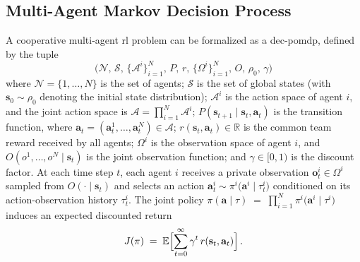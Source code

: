 \subsection{Multi-Agent Markov Decision Process}
A cooperative multi-agent \gls{rl} problem can be formalized as a \gls{dec-pomdp}\cite{oliehoek_concise_2016}, defined by the tuple
\begin{equation}
  \bigl(\mathcal{N},\,\mathcal{S},\,\{\mathcal{A}^i\}_{i=1}^N,\,P,\,r,\,\{\Omega^i\}_{i=1}^N,\,O,\,\rho_0,\,\gamma\bigr)
\end{equation}
where $\mathcal{N}=\{1,\dots,N\}$ is the set of agents; $\mathcal{S}$ is the set of global states (with $\mathbf{s}_0\sim\rho_0$ denoting the initial state distribution); $\mathcal{A}^i$ is the action space of agent $i$, and the joint action space is $\mathcal{A} = \prod_{i=1}^N \mathcal{A}^i$; $P(\mathbf{s}_{t+1} \mid \mathbf{s}_t, \mathbf{a}_t)$ is the transition function, where $\mathbf{a}_t=(\mathbf{a}^1_t,\dots,\mathbf{a}^N_t)\in\mathcal{A}$; $r(\mathbf{s}_t,\mathbf{a}_t)\in\mathbb{R}$ is the common team reward received by all agents; $\Omega^i$ is the observation space of agent $i$, and $O(o^1,\dots,o^N\mid \mathbf{s}_t)$ is the joint observation function; and $\gamma\in[0,1)$ is the discount factor.
At each time step $t$, each agent $i$ receives a private observation $\mathbf{o}^i_t \in \Omega^i$ sampled from $O(\cdot\mid \mathbf{s}_t)$ and selects an action 
$\mathbf{a}^i_t \sim \pi^i\bigl(\mathbf{a}^i\mid \tau^i_t\bigr)$
conditioned on its action-observation history \(\tau^i_t\). The joint policy 
\(\pi(\mathbf{a}\mid \tau) \;=\; \prod_{i=1}^N \pi^i\bigl(\mathbf{a}^i\mid \tau^i\bigr)\)
induces an expected discounted return
\begin{equation}
  J(\pi) \;=\; \mathbb{E}\Bigl[\sum_{t=0}^\infty \gamma^t\,r(\mathbf{s}_t,\mathbf{a}_t)\Bigr]\,. 
\end{equation}


